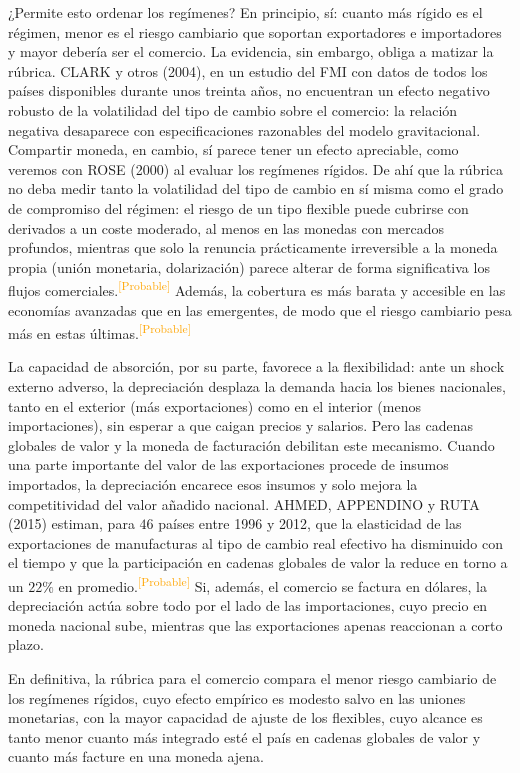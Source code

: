 \documentclass[10pt,a4paper]{article}
\begin{document}
¿Permite esto ordenar los regímenes? En principio, sí: cuanto más rígido es el régimen, menor es el riesgo cambiario que soportan exportadores e importadores y mayor debería ser el comercio. La evidencia, sin embargo, obliga a matizar la rúbrica. CLARK y otros (2004), en un estudio del FMI con datos de todos los países disponibles durante unos treinta años, no encuentran un efecto negativo robusto de la volatilidad del tipo de cambio sobre el comercio: la relación negativa desaparece con especificaciones razonables del modelo gravitacional. Compartir moneda, en cambio, sí parece tener un efecto apreciable, como veremos con ROSE (2000) al evaluar los regímenes rígidos. De ahí que la rúbrica no deba medir tanto la volatilidad del tipo de cambio en sí misma como el grado de compromiso del régimen: el riesgo de un tipo flexible puede cubrirse con derivados a un coste moderado, al menos en las monedas con mercados profundos, mientras que solo la renuncia prácticamente irreversible a la moneda propia (unión monetaria, dolarización) parece alterar de forma significativa los flujos comerciales.\textcolor{orange}{\textsuperscript{[Probable]}} Además, la cobertura es más barata y accesible en las economías avanzadas que en las emergentes, de modo que el riesgo cambiario pesa más en estas últimas.\textcolor{orange}{\textsuperscript{[Probable]}}

La capacidad de absorción, por su parte, favorece a la flexibilidad: ante un shock externo adverso, la depreciación desplaza la demanda hacia los bienes nacionales, tanto en el exterior (más exportaciones) como en el interior (menos importaciones), sin esperar a que caigan precios y salarios. Pero las cadenas globales de valor y la moneda de facturación debilitan este mecanismo. Cuando una parte importante del valor de las exportaciones procede de insumos importados, la depreciación encarece esos insumos y solo mejora la competitividad del valor añadido nacional. AHMED, APPENDINO y RUTA (2015) estiman, para $46$ países entre 1996 y 2012, que la elasticidad de las exportaciones de manufacturas al tipo de cambio real efectivo ha disminuido con el tiempo y que la participación en cadenas globales de valor la reduce en torno a un $22\%$ en promedio.\textcolor{orange}{\textsuperscript{[Probable]}} Si, además, el comercio se factura en dólares, la depreciación actúa sobre todo por el lado de las importaciones, cuyo precio en moneda nacional sube, mientras que las exportaciones apenas reaccionan a corto plazo.

En definitiva, la rúbrica para el comercio compara el menor riesgo cambiario de los regímenes rígidos, cuyo efecto empírico es modesto salvo en las uniones monetarias, con la mayor capacidad de ajuste de los flexibles, cuyo alcance es tanto menor cuanto más integrado esté el país en cadenas globales de valor y cuanto más facture en una moneda ajena.
\end{document}
